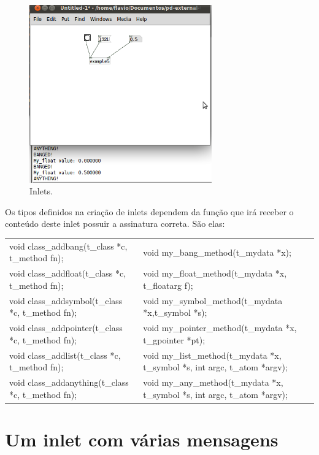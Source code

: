 \documentclass[10pt,a4paper]{report}
\begin{document}
\begin{figure}[h!]
	\centering
	\includegraphics[width=0.7\textwidth]{example5}
	\caption{Inlets.}
\end{figure}

Os tipos definidos na criação de inlets dependem da função que irá receber o conteúdo deste inlet possuir a assinatura correta. São elas:

\begin{table}[ht]
\centering
\begin{tabular}{ll}
\hline
\hline
void class\_addbang(t\_class *c, t\_method fn); 	& void my\_bang\_method(t\_mydata *x); \\
void class\_addfloat(t\_class *c, t\_method fn);	& void my\_float\_method(t\_mydata *x, t\_floatarg f); \\
void class\_addsymbol(t\_class *c, t\_method fn);	& void my\_symbol\_method(t\_mydata *x,t\_symbol *s); \\
void class\_addpointer(t\_class *c, t\_method fn);	& void my\_pointer\_method(t\_mydata *x, t\_gpointer *pt); \\
void class\_addlist(t\_class *c, t\_method fn);		& void my\_list\_method(t\_mydata *x, t\_symbol *s, int argc, t\_atom *argv); \\
void class\_addanything(t\_class *c, t\_method fn);	& void my\_any\_method(t\_mydata *x, t\_symbol *s, int argc, t\_atom *argv); \\
\hline
\hline
\end{tabular}
\end{table}

\section{Um inlet com várias mensagens}
\end{document}
